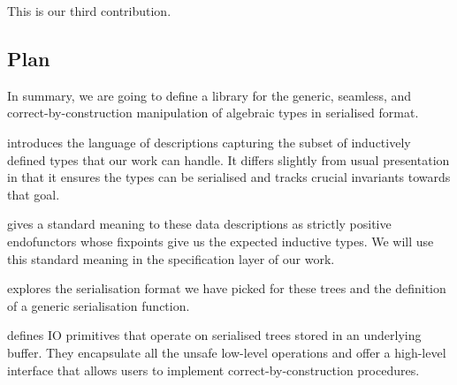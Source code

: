 This is our third contribution.

\subsection{Plan}

In summary, we are going to define a library for the
generic,
seamless,
and correct-by-construction
manipulation of algebraic types in serialised format.


 introduces the language of descriptions capturing the
subset of inductively defined types that our work can handle.
It differs slightly from usual presentation in that it ensures the
types can be serialised and tracks crucial invariants towards that goal.

 gives a standard meaning to these data descriptions
as strictly positive endofunctors whose fixpoints give us the expected
inductive types.
%
We will use this standard meaning in the specification layer of our work.

 explores the serialisation format we have picked
for these trees and the definition of a generic serialisation function.

 defines IO primitives that operate on serialised
trees stored in an underlying buffer.
%
They encapsulate all the unsafe low-level operations and offer a
high-level interface that allows users to implement correct-by-construction
procedures.


